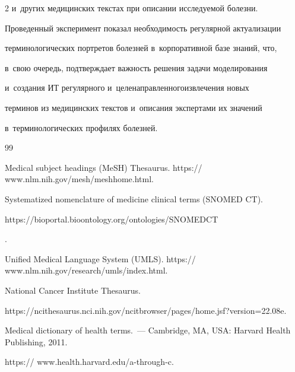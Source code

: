 \begin{multicols}{2}
и~других медицинских текстах при описании исследуемой болезни. 

Проведенный эксперимент показал необходимость регулярной актуализации\linebreak 

терминологических портретов болезней в~корпоративной базе знаний, что, 

в~свою очередь, под\-тверж\-да\-ет важ\-ность решения задачи моделирования 

и~создания ИТ регулярного и~\mbox{целенаправленного}\linebreak извлечения новых 

терминов из медицинских текс\-тов и~описания экспертами их значений 

в~терминологических профилях болезней.

  

{\small\frenchspacing

 {%


 \begin{thebibliography}{99}


Medical subject headings (MeSH) Thesaurus. {\sf https:// www.nlm.nih.gov/mesh/meshhome.html.}


Systematized nomenclature of medicine clinical terms (SNOMED CT). {\sf 

https://bioportal.bioontology.org/\linebreak ontologies/SNOMEDCT}.


Unified Medical Language System (UMLS). {\sf https:// www.nlm.nih.gov/research/umls/index.html.}


National Cancer Institute Thesaurus. {\sf 

https://\linebreak ncithesaurus.nci.nih.gov/ncitbrowser/pages/home.jsf?\linebreak version=22.08e.}


Medical dictionary of health terms.~--- Cambridge, MA, USA: Harvard Health Publishing, 2011. 

{\sf https:// www.health.harvard.edu/a-through-c}.



\end{thebibliography}}}
\end{multicols}
